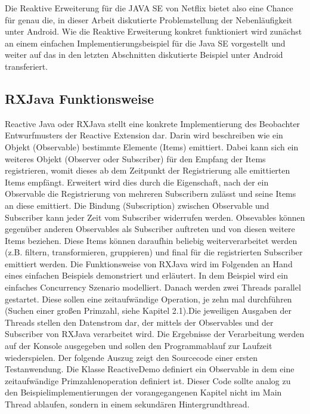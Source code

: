 \documentclass[12pt,oneside,a4paper,bibtotoc,liststotoc]{scrreprt}
\begin{document}
Die Reaktive Erweiterung für die JAVA SE von Netflix bietet also eine Chance für genau die, in dieser Arbeit diskutierte Problemstellung der Nebenläufigkeit unter Android. Wie die Reaktive Erweiterung konkret funktioniert wird zunächst an einem einfachen Implementierungsbeispiel für die Java SE vorgestellt und weiter auf das in den letzten Abschnitten diskutierte Beispiel unter Android transferiert.
\subsection{RXJava Funktionsweise}
Reactive Java oder RXJava stellt eine konkrete Implementierung des Beobachter Entwurfmusters der Reactive Extension dar. Darin wird beschreiben wie ein Objekt (Observable) bestimmte Elemente (Items) emittiert. Dabei kann sich ein weiteres Objekt (Observer oder Subscriber) für den Empfang der Items registrieren, womit dieses ab dem Zeitpunkt der Registrierung alle emittierten Items empfängt. Erweitert wird dies durch die Eigenschaft, nach der ein Observable die Registrierung von mehreren Subscribern zulässt und seine Items an diese emittiert. Die Bindung (Subscription) zwischen Observable und Subscriber kann jeder Zeit vom Subscriber widerrufen werden. Obsevables können gegenüber anderen Observables als Subscriber auftreten und von diesen weitere Items beziehen. Diese Items können daraufhin beliebig weiterverarbeitet werden (z.B. filtern, transformieren, gruppieren) und final für die registrierten Subscriber emittiert werden.\newline
Die Funktionsweise von RXJava wird im Folgenden an Hand eines einfachen Beispiels demonstriert und erläutert. In dem Beispiel wird ein einfaches Concurrency Szenario modelliert. Danach werden zwei Threads parallel gestartet. Diese sollen eine zeitaufwändige Operation, je zehn mal durchführen (Suchen einer großen Primzahl, siehe Kapitel 2.1).Die jeweiligen Ausgaben der Threads stellen den Datenstrom dar, der mittels der Observables und der Subscriber von RXJava verarbeitet wird. Die Ergebnisse der Verarbeitung werden auf der Konsole ausgegeben und sollen den Programmablauf zur Laufzeit wiederspielen. Der folgende Auszug zeigt den Sourcecode einer ersten Testanwendung. Die Klasse ReactiveDemo definiert ein Observable in dem eine zeitaufwändige Primzahlenoperation definiert ist. Dieser Code sollte analog zu den Beispielimplementierungen der vorangegangenen Kapitel nicht im Main Thread ablaufen, sondern in einem sekundären Hintergrundthread.\newline
\end{document}
